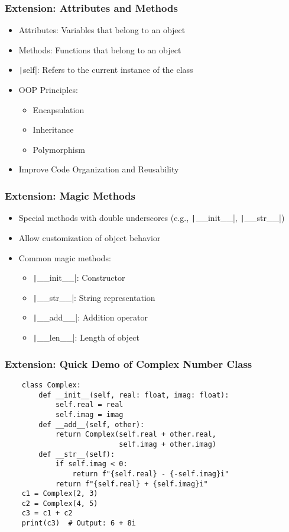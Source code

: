 \documentclass{beamer}
\newcommand{\python}[1]{\texttt|#1|}
\begin{document}
\begin{frame}
    \frametitle{Extension: Attributes and Methods}
    \begin{itemize}
        \item Attributes: Variables that belong to an object
        \item Methods: Functions that belong to an object
        \item \python{self}: Refers to the current instance of the class
        \item OOP Principles:
              \begin{itemize}
                  \item Encapsulation
                  \item Inheritance
                  \item Polymorphism
              \end{itemize}
        \item Improve Code Organization and Reusability
    \end{itemize}
\end{frame}

\begin{frame}
    \frametitle{Extension: Magic Methods}
    \begin{itemize}
        \item Special methods with double underscores (e.g., \python{__init__}, \python{__str__})
        \item Allow customization of object behavior
        \item Common magic methods:
              \begin{itemize}
                  \item \python{__init__}: Constructor
                  \item \python{__str__}: String representation
                  \item \python{__add__}: Addition operator
                  \item \python{__len__}: Length of object
              \end{itemize}
    \end{itemize}
\end{frame}

\begin{frame}[fragile]
    \frametitle{Extension: Quick Demo of Complex Number Class}
    \begin{verbatim}
    class Complex:
        def __init__(self, real: float, imag: float):
            self.real = real
            self.imag = imag
        def __add__(self, other):
            return Complex(self.real + other.real,
                           self.imag + other.imag)
        def __str__(self):
            if self.imag < 0:
                return f"{self.real} - {-self.imag}i"
            return f"{self.real} + {self.imag}i"
    c1 = Complex(2, 3)
    c2 = Complex(4, 5)
    c3 = c1 + c2
    print(c3)  # Output: 6 + 8i
    \end{verbatim}    
\end{frame}
\end{document}
